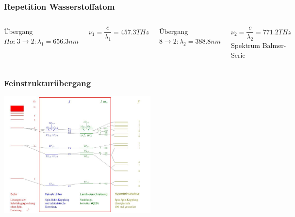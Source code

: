 \begin{frame}
	\frametitle{Repetition Wasserstoffatom}
	\begin{columns}

	Übergang $H\alpha: 3 \rightarrow 2: \lambda_1 = 656.3nm$
		 	
		 	$\nu_1 = \dfrac{c}{\lambda_1} = 457.3 THz $
		 	\vspace{.5cm}
		 	
		 	Übergang $8 \rightarrow 2: \lambda_2 = 388.8nm$
		 	
		 	$\nu_2 = \dfrac{c}{\lambda_2} = 771.2 THz$
	Spektrum Balmer-Serie
				
	\includegraphics[width = 5cm]{./pictures/wasserstoffSpektrum}
				
	\end{columns}
\end{frame}


\begin{frame}
	\frametitle {Feinstrukturübergang}

	\begin{center}
		\includegraphics[width = 8cm]{./pictures/energieniveaus2}
	\end{center}
	
\end{frame}


